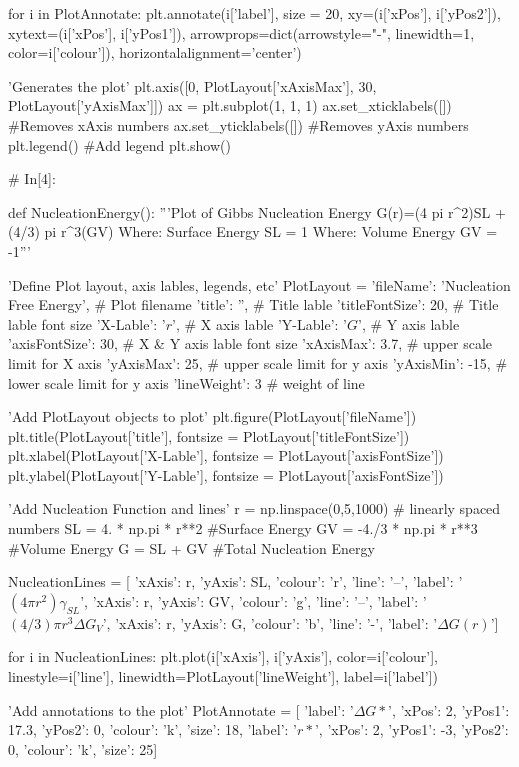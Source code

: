 \documentclass[a4paper,8pt]{article}
\begin{document}
\begin{python}
for i in PlotAnnotate:
plt.annotate(i['label'], size = 20, xy=(i['xPos'], i['yPos2']),
xytext=(i['xPos'], i['yPos1']),
arrowprops=dict(arrowstyle="-", linewidth=1,
color=i['colour']),
horizontalalignment='center')

'Generates the plot'
plt.axis([0, PlotLayout['xAxisMax'], 30, PlotLayout['yAxisMax']])
ax = plt.subplot(1, 1, 1)
ax.set_xticklabels([]) #Removes xAxis numbers
ax.set_yticklabels([]) #Removes yAxis numbers
plt.legend() #Add legend
plt.show()


# In[4]:

def NucleationEnergy():
'''Plot of Gibbs Nucleation Energy
G(r)=(4 pi r^2)SL + (4/3) pi r^3(GV)
Where: Surface Energy SL = 1
Where: Volume Energy GV = -1'''

'Define Plot layout, axis lables, legends, etc'
PlotLayout = {'fileName': 'Nucleation Free Energy', # Plot filename 
	'title': '', # Title lable
	'titleFontSize': 20, # Title lable font size
	'X-Lable': '$r$', # X axis lable
	'Y-Lable': '$G$', # Y axis lable
	'axisFontSize': 30, # X & Y axis lable font size
	'xAxisMax': 3.7, # upper scale limit for X axis
	'yAxisMax': 25, # upper scale limit for y axis
	'yAxisMin': -15, # lower scale limit for y axis
	'lineWeight': 3 # weight of line
}

'Add PlotLayout objects to plot'
plt.figure(PlotLayout['fileName'])
plt.title(PlotLayout['title'], fontsize = PlotLayout['titleFontSize'])
plt.xlabel(PlotLayout['X-Lable'], fontsize = PlotLayout['axisFontSize'])
plt.ylabel(PlotLayout['Y-Lable'], fontsize = PlotLayout['axisFontSize'])

'Add Nucleation Function and lines'
r = np.linspace(0,5,1000) # linearly spaced numbers
SL = 4. * np.pi * r**2 #Surface Energy
GV = -4./3 * np.pi * r**3 #Volume Energy
G = SL + GV #Total Nucleation Energy

NucleationLines = [
{'xAxis': r, 'yAxis': SL, 'colour': 'r', 'line': '--',
	'label': '$(4 \pi r^{2}) \gamma_{SL}$'},
{'xAxis': r, 'yAxis': GV, 'colour': 'g', 'line': '--',
	'label': '$(4/3) \pi r^{3} \Delta G_{V}$'},
{'xAxis': r, 'yAxis': G, 'colour': 'b', 'line': '-',
	'label': '$\Delta G(r)$'}]

for i in NucleationLines:
plt.plot(i['xAxis'], i['yAxis'], 
color=i['colour'], linestyle=i['line'], 
linewidth=PlotLayout['lineWeight'],
label=i['label'])

'Add annotations to the plot'
PlotAnnotate = [
{'label': '$\Delta G{*}$', 'xPos': 2, 'yPos1': 17.3, 'yPos2': 0,
	'colour': 'k', 'size': 18},
{'label': '$r{*}$', 'xPos': 2, 'yPos1': -3, 'yPos2': 0,
	'colour': 'k', 'size': 25}]


\end{python}
\end{document}
